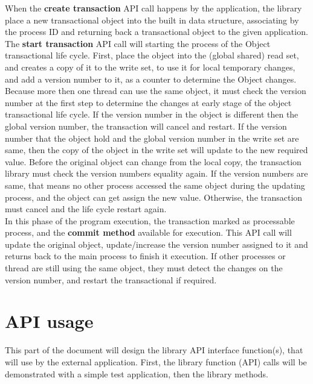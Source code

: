 \documentclass[12pt]{article}
\begin{document}
When the \textbf{create transaction} API call happens by the application, the library place a new transactional object into the built in data structure, associating by the process ID and returning back a transactional object to the given application.\\

The \textbf{start transaction} API call will starting the process of the Object transactional life cycle. First, place the object into the (global shared) read set, and creates a copy of it to the write set, to use it for local temporary changes, and add a version number to it, as a counter to determine the Object changes. Because more then one thread can use the same object, it must check the version number at the first step to determine the changes at early stage of the object transactional life cycle. If the version number in the object is different then the global version number, the transaction will cancel and restart. If the version number that the object hold and the global version number in the write set are same, then the copy of the object in the write set will update to the new required value. Before the original object can change from the local copy, the transaction library must check the version numbers equality again. If the version numbers are same, that means no other process accessed the same object during the updating process, and the object can get assign the new value. Otherwise, the transaction must cancel and the life cycle restart again.\\

In this phase of the program execution, the transaction marked as processable process, and the \textbf{commit method} available for execution. This API call will update the original object, update/increase the version number assigned to it and returns back to the main process to finish it execution. If other processes or thread are still using the same object, they must detect the changes on the version number, and restart the transactional if required.

\newpage
\section{API usage}
This part of the document will design the library API interface function(s), that will use by the external application. First, the library function (API) calls will be demonstrated with a simple test application, then the library methods.\\
\end{document}
